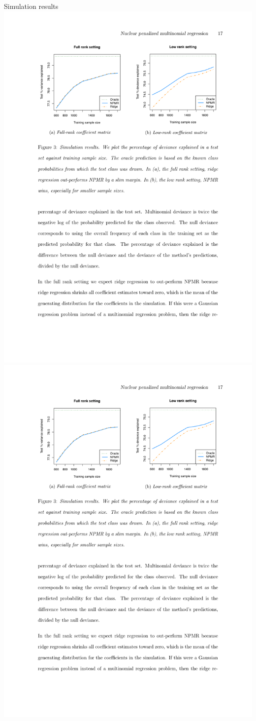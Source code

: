 \documentclass[handout]{beamer}
\begin{document}
\begin{frame}{Simulation results}
\includegraphics[width = .5\textwidth]{figures/sim_full.pdf}\hfill
\includegraphics[width = .5\textwidth]{figures/sim_low.pdf}
\end{frame}
\end{document}
